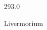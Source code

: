\documentclass[12pt]{article}
\begin{document}
\hfill{}
\vfill
\begin{center}
  {\fontsize{50}{60}
  }

  293.0

Livermorium
\end{center}
\vfill
\end{document}
